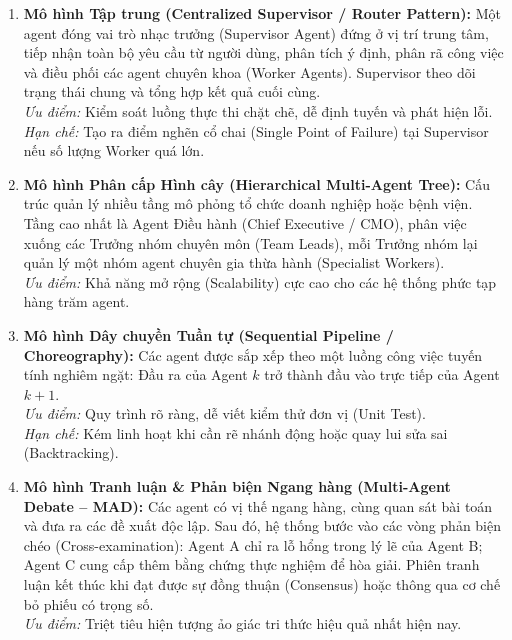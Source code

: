\documentclass[12pt,a4paper]{report}
\begin{document}
\begin{enumerate}[leftmargin=1.2cm]
    \item \textbf{Mô hình Tập trung (Centralized Supervisor / Router Pattern):} Một agent đóng vai trò nhạc trưởng (Supervisor Agent) đứng ở vị trí trung tâm, tiếp nhận toàn bộ yêu cầu từ người dùng, phân tích ý định, phân rã công việc và điều phối các agent chuyên khoa (Worker Agents). Supervisor theo dõi trạng thái chung và tổng hợp kết quả cuối cùng. \\
    \textit{Ưu điểm:} Kiểm soát luồng thực thi chặt chẽ, dễ định tuyến và phát hiện lỗi. \\
    \textit{Hạn chế:} Tạo ra điểm nghẽn cổ chai (Single Point of Failure) tại Supervisor nếu số lượng Worker quá lớn.
    
    \item \textbf{Mô hình Phân cấp Hình cây (Hierarchical Multi-Agent Tree):} Cấu trúc quản lý nhiều tầng mô phỏng tổ chức doanh nghiệp hoặc bệnh viện. Tầng cao nhất là Agent Điều hành (Chief Executive / CMO), phân việc xuống các Trưởng nhóm chuyên môn (Team Leads), mỗi Trưởng nhóm lại quản lý một nhóm agent chuyên gia thừa hành (Specialist Workers). \\
    \textit{Ưu điểm:} Khả năng mở rộng (Scalability) cực cao cho các hệ thống phức tạp hàng trăm agent.
    
    \item \textbf{Mô hình Dây chuyền Tuần tự (Sequential Pipeline / Choreography):} Các agent được sắp xếp theo một luồng công việc tuyến tính nghiêm ngặt: Đầu ra của Agent $k$ trở thành đầu vào trực tiếp của Agent $k+1$. \\
    \textit{Ưu điểm:} Quy trình rõ ràng, dễ viết kiểm thử đơn vị (Unit Test). \\
    \textit{Hạn chế:} Kém linh hoạt khi cần rẽ nhánh động hoặc quay lui sửa sai (Backtracking).
    
    \item \textbf{Mô hình Tranh luận \& Phản biện Ngang hàng (Multi-Agent Debate -- MAD):} Các agent có vị thế ngang hàng, cùng quan sát bài toán và đưa ra các đề xuất độc lập. Sau đó, hệ thống bước vào các vòng phản biện chéo (Cross-examination): Agent A chỉ ra lỗ hổng trong lý lẽ của Agent B; Agent C cung cấp thêm bằng chứng thực nghiệm để hòa giải. Phiên tranh luận kết thúc khi đạt được sự đồng thuận (Consensus) hoặc thông qua cơ chế bỏ phiếu có trọng số. \\
    \textit{Ưu điểm:} Triệt tiêu hiện tượng ảo giác tri thức hiệu quả nhất hiện nay.
\end{enumerate}
\end{document}
